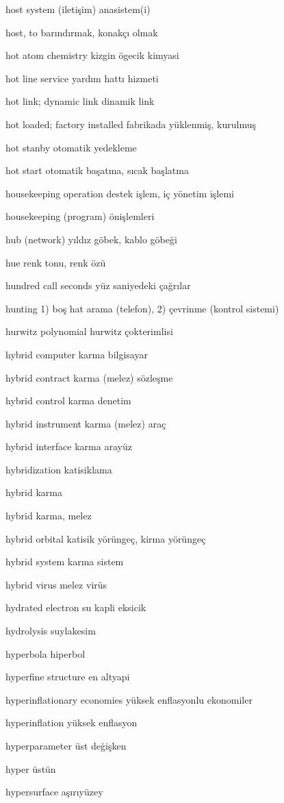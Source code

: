\documentclass[12pt,fleqn]{article}\usepackage{../../common}
\begin{document}
host system (iletişim) anasistem(i)

host, to barındırmak, konakçı olmak

hot atom chemistry kizgin ögecik kimyasi

hot line service yardım hattı hizmeti

hot link; dynamic link dinamik link

hot loaded; factory installed fabrikada yüklenmiş, kurulmuş

hot stanby otomatik yedekleme

hot start otomatik başatma, sıcak başlatma

housekeeping operation destek işlem, iç yönetim işlemi

housekeeping (program) önişlemleri

hub (network) yıldız göbek, kablo göbeği

hue renk tonu, renk özü

hundred call seconds yüz saniyedeki çağrılar

hunting 1) boş hat arama (telefon), 2) çevrinme (kontrol sistemi)

hurwitz polynomial hurwitz çokterimlisi

hybrid computer karma bilgisayar

hybrid contract karma (melez) sözleşme

hybrid control karma denetim

hybrid instrument karma (melez) araç

hybrid interface karma arayüz

hybridization katisiklama

hybrid karma

hybrid karma, melez

hybrid orbital katisik yörüngeç, kirma yörüngeç

hybrid system karma sistem

hybrid virus melez virüs

hydrated electron su kapli eksicik

hydrolysis suylakesim

hyperbola hiperbol

hyperfine structure en altyapi

hyperinflationary economies yüksek enflasyonlu ekonomiler

hyperinflation yüksek enflasyon

hyperparameter üst değişken

hyper üstün

hypersurface aşırıyüzey
\end{document}
